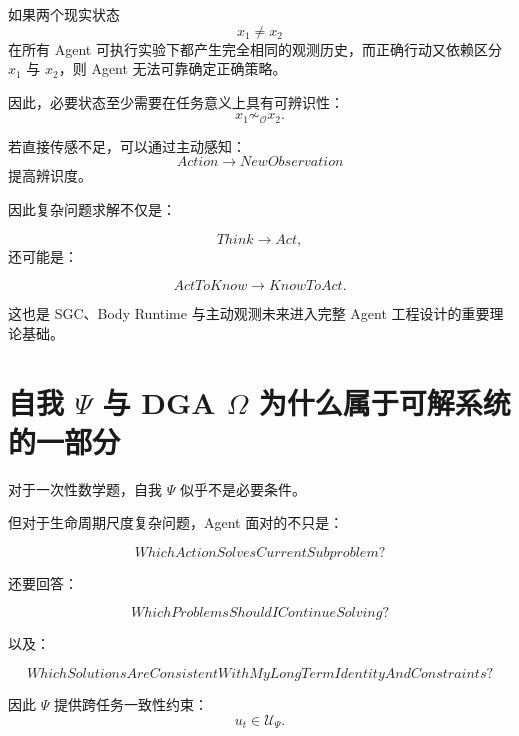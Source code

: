 如果两个现实状态
\begin{equation}
x_1\neq x_2
\end{equation}
在所有 Agent 可执行实验下都产生完全相同的观测历史，而正确行动又依赖区分 $x_1$ 与 $x_2$，则 Agent 无法可靠确定正确策略。

因此，必要状态至少需要在任务意义上具有可辨识性：
\begin{equation}
x_1
\not\sim_{\mathcal O}
x_2.
\end{equation}

若直接传感不足，可以通过主动感知：
\begin{equation}
Action
\rightarrow
NewObservation
\end{equation}
提高辨识度。

因此复杂问题求解不仅是：

\begin{equation}
Think\rightarrow Act,
\end{equation}
还可能是：

\begin{equation}
ActToKnow
\rightarrow
KnowToAct.
\end{equation}

这也是 SGC、Body Runtime 与主动观测未来进入完整 Agent 工程设计的重要理论基础。

\section{自我 $\Psi$ 与 DGA $\Omega$ 为什么属于可解系统的一部分}

对于一次性数学题，自我 $\Psi$ 似乎不是必要条件。

但对于生命周期尺度复杂问题，Agent 面对的不只是：

\begin{equation}
WhichActionSolvesCurrentSubproblem?
\end{equation}

还要回答：

\begin{equation}
WhichProblemsShouldIContinueSolving?
\end{equation}

以及：

\begin{equation}
WhichSolutionsAreConsistentWithMyLongTermIdentityAndConstraints?
\end{equation}

因此 $\Psi$ 提供跨任务一致性约束：
\begin{equation}
u_t
\in
\mathcal U_{\Psi}.
\end{equation}

